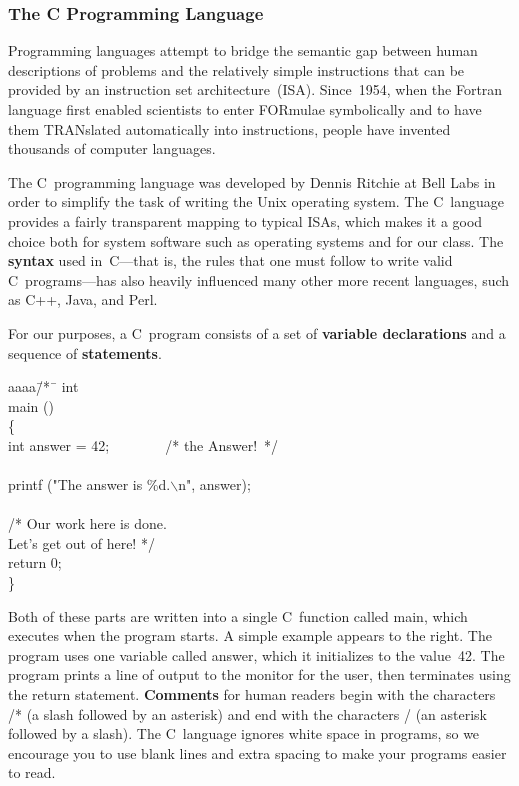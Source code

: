 \subsubsection{The C Programming Language}

Programming languages attempt to bridge the semantic gap between human
descriptions of problems and the relatively simple instructions that
can be provided by an instruction set architecture~(ISA).  
Since~1954, when the Fortran language
first enabled scientists to enter FORmulae symbolically and to have
them TRANslated automatically into instructions, people have invented
thousands of computer languages.  \vspace{2pt}

\begin{minipage}{3.25in}
The C~programming language was developed by Dennis Ritchie at Bell Labs
in order to simplify the task of writing the Unix operating system.
The C~language provides a fairly transparent mapping to typical ISAs,
which makes it a good choice both for system software such as operating
systems and for our class.
%
The {\bf syntax} used in~C---that is, the rules that one must follow
to write valid C~programs---has also heavily influenced many other
more recent languages, such as C++, Java, and Perl.  \mpline

For our purposes, a C~program consists of a set of {\bf variable 
declarations} and a sequence of {\bf statements}.  \linebreak\mpdone
\end{minipage}\hspace{0.25in}%
\begin{minipage}{3in}
{\fix
\begin{tabbing}
aaaa\=/*~\=\kill
int\\
main ()\\
\{\\
\>  int answer = 42;~~~~~~~~/* the Answer!~*/\\
\\
\>  printf ("The answer is \%d.$\backslash$n", answer);\\
\\
\>  /*\> Our work here is done.\\
\>    \> Let's get out of here! */\\
\>  return 0;\\
\}
\end{tabbing}
}
\end{minipage}

Both of these parts are written into a single C~function called {\tfix main},
which executes when the program starts.  
%
A simple example appears to the right.  The program uses one variable
called {\tfix answer}, which it initializes to the value~42.
The program prints a line of output to the monitor for the user,
then terminates using the {\tfix return} statement.  {\bf Comments} for human
readers begin with the characters {\tfix /*} (a slash followed by an 
asterisk) and end with the characters {\tfix */} (an asterisk followed 
by a slash).
%
The C~language ignores white space in programs, so we encourage
you to use blank lines and extra spacing to make your programs
easier to read.

